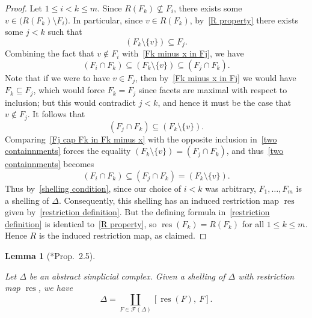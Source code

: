 \documentclass[noamsfonts,10pt]{amsart}
\newcommand{\F}{\mathcal{F}}
\newcommand{\res}{\operatorname{res}}
\newcommand{\1}{\mathbf{1}}
\theoremstyle{plain}
\newtheorem{lemma}[theorem]{Lemma}
\theoremstyle{definition}
\numberwithin{equation}{section}
\begin{document}
\begin{proof}
    Let $1 \leq i < k \leq m$.
    Since $R(F_k) \not\subseteq F_i$, there exists some $v \in \big( R(F_k) \setminus F_i \big)$.
    In particular, since $v \in R(F_k)$, by~\eqref{R property} there exists some $j < k$ such that \begin{equation}
        \label{Fk minus x in Fj}
        (F_k \setminus \{v\}) \subseteq F_j.
    \end{equation}
    Combining the fact that $v \notin F_i$ with~\eqref{Fk minus x in Fj}, we have
    \begin{equation}
        \label{two containnments}
        (F_i \cap F_k) \subseteq (F_k \setminus \{v\}) \subseteq (F_j \cap F_k).
    \end{equation}
    Note that if we were to have  $v \in F_j$, then by~\eqref{Fk minus x in Fj} we would have $F_k \subseteq F_j$, which would force $F_k = F_j$ since facets are maximal with respect to inclusion;
    but this would contradict $j < k$, and hence it must be the case that $v \notin F_j$.
    It follows that
    \begin{equation}
        \label{Fj cap Fk in Fk minus x}
        (F_j \cap F_k) \subseteq (F_k \setminus \{v\}).
    \end{equation}
    Comparing~\eqref{Fj cap Fk in Fk minus x} with the opposite inclusion in~\eqref{two containnments} forces the equality $(F_k \setminus \{v\}) = (F_j \cap F_k)$, and thus~\eqref{two containnments} becomes
    \[
        (F_i \cap F_k) \subseteq (F_j \cap F_k) = (F_k \setminus \{v\}).
    \]
    Thus by~\eqref{shelling condition}, since our choice of $i < k$ was arbitrary,  $F_1, \ldots, F_m$ is a shelling of $\Delta$.
    Consequently, this shelling has an induced restriction map $\res$ given by~\eqref{restriction definition}.
    But the defining formula in~\eqref{restriction definition} is identical to~\eqref{R property}, so $\res(F_k) = R(F_k)$ for all $ 1 \leq k \leq m$.
    Hence $R$ is the induced restriction map, as claimed.
\end{proof}

\begin{lemma}[\cite{BjornerWachs}*{Prop.~2.5}]
    \label{lemma:complex partition}

    Let $\Delta$ be an abstract simplicial complex.
    Given a shelling of $\Delta$ with restriction map $\res$, we have
    \[
        \Delta = \coprod_{F \in \F(\Delta)} [ \res(F), \: F].
    \]
\end{lemma}
\end{document}
